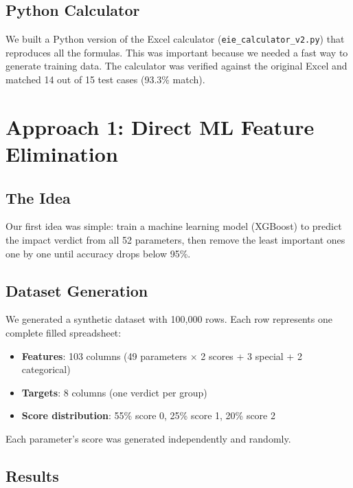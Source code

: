 \documentclass[12pt,a4paper]{article}
\begin{document}
\subsection{Python Calculator}

We built a Python version of the Excel calculator (\texttt{eie\_calculator\_v2.py}) that reproduces all the formulas. This was important because we needed a fast way to generate training data. The calculator was verified against the original Excel and matched 14 out of 15 test cases (93.3\% match).

\section{Approach 1: Direct ML Feature Elimination}

\subsection{The Idea}

Our first idea was simple: train a machine learning model (XGBoost) to predict the impact verdict from all 52 parameters, then remove the least important ones one by one until accuracy drops below 95\%.

\subsection{Dataset Generation}

We generated a synthetic dataset with 100,000 rows. Each row represents one complete filled spreadsheet:

\begin{itemize}
    \item \textbf{Features}: 103 columns (49 parameters $\times$ 2 scores + 3 special + 2 categorical)
    \item \textbf{Targets}: 8 columns (one verdict per group)
    \item \textbf{Score distribution}: 55\% score 0, 25\% score 1, 20\% score 2
\end{itemize}

Each parameter's score was generated independently and randomly.

\subsection{Results}
\end{document}
